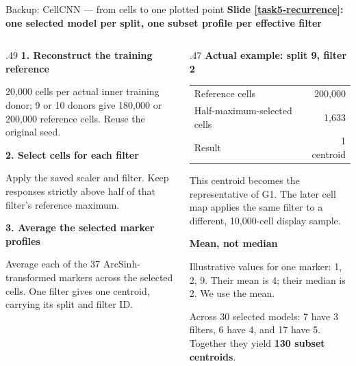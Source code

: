 \documentclass[aspectratio=169,10pt]{beamer}
\newcommand{\eyebrow}[1]{{\color{Teal}\bfseries #1}\par\smallskip}
\begin{document}
\begin{frame}{Backup: CellCNN --- from cells to one plotted point}
  \small
  \eyebrow{Slide \ref{task5-recurrence}: one selected model per split, one subset profile per effective filter}
  \begin{columns}[T,onlytextwidth]
    \begin{column}{.49\textwidth}
      \textbf{1. Reconstruct the training reference}\par
      20,000 cells per actual inner training donor; 9 or 10 donors give 180,000 or 200,000 reference cells. Reuse the original seed.\par\medskip
      \textbf{2. Select cells for each filter}\par
      Apply the saved scaler and filter. Keep responses strictly above half of that filter's reference maximum.\par\medskip
      \textbf{3. Average the selected marker profiles}\par
      Average each of the 37 ArcSinh-transformed markers across the selected cells. One filter gives one centroid, carrying its split and filter ID.
    \end{column}
    \begin{column}{.47\textwidth}
      \eyebrow{Actual example: split 9, filter 2}
      \begin{tabular}{@{}lr@{}}\toprule
        Reference cells & 200,000\\
        Half-maximum-selected cells & 1,633\\
        Result & 1 centroid\\\bottomrule
      \end{tabular}\par\medskip
      This centroid becomes the representative of G1. The later cell map applies the same filter to a different, 10,000-cell display sample.\par\medskip
      \textbf{Mean, not median}\par
      Illustrative values for one marker: 1, 2, 9. Their mean is 4; their median is 2. We use the mean.\par\medskip
      Across 30 selected models: 7 have 3 filters, 6 have 4, and 17 have 5. Together they yield \textbf{130 subset centroids}.
    \end{column}
  \end{columns}
\end{frame}
\end{document}

